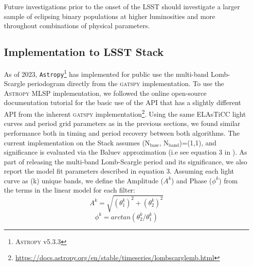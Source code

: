 \documentclass[DM,authoryear,toc]{lsstdoc}
\begin{document}
Future investigations prior to the onset of the LSST should investigate a larger sample of eclipsing binary populations at higher luminosities and more throughout  combinations of physical parameters.

\subsection{Implementation to LSST Stack}\label{sec:stack}

As of 2023, \texttt{Astropy}\footnote{\textsc{Astropy} v5.3.3} has implemented for public use the multi-band Lomb-Scargle periodogram directly from the \textsc{gatspy} implementation. To use the \textsc{Astropy} MLSP implementation, we followed the online open-source documentation tutorial for the basic use of the API that has a slightly different API from the inherent \textsc{gatspy} implementation\footnote{\href{https://docs.astropy.org/en/stable/timeseries/lombscarglemb.html}{https://docs.astropy.org/en/stable/timeseries/lombscarglemb.html}}. Using the same  ELAsTiCC light curves and period grid parameters as in the previous sections, we found similar performance both in timing and period recovery between both algorithms. The current implementation on the Stack assumes (N$_{\text{base}}$, N$_{\text{band}}$)=(1,1), and significance is evaluated via the Baluev approximation (i.e see equation 3 in \citet{Suveges:Suveges15}). As part of releasing the multi-band Lomb-Scargle period and its significance, we also report the model fit parameters described in equation 3. Assuming each light curve as (k) unique bands, we define the Amplitude ($A^{k}$) and Phase ($\phi^{k}$) from the terms in the linear model for each filter:
\begin{equation}
A^{k} = \sqrt{(\theta_{1}^{k})^2 + (\theta_{2}^{k})^2}
\end{equation}
\begin{equation}
\phi^{k} = arctan(\theta_2^{k}/\theta_{1}^{k})
\end{equation}
\end{document}
